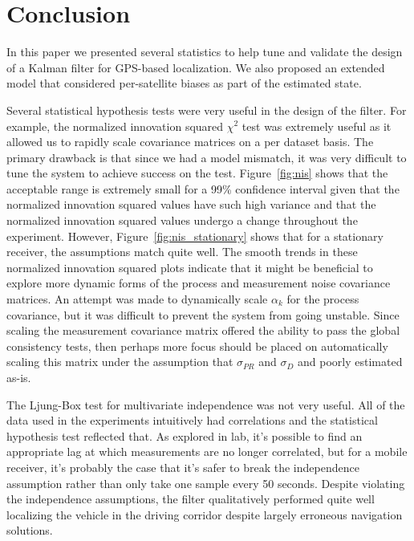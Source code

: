 \section{Conclusion}\label{sec:conclusion}
In this paper we presented several statistics to help tune and validate the design of a Kalman filter for GPS-based localization.  We also proposed an extended model that considered per-satellite biases as part of the estimated state.

Several statistical hypothesis tests were very useful in the design of the filter.  For example, the normalized innovation squared $\chi^2$ test was extremely useful as it allowed us to rapidly scale covariance matrices on a per dataset basis.  The primary drawback is that since we had a model mismatch, it was very difficult to tune the system to achieve success on the test.  Figure~\ref{fig:nis} shows that the acceptable range is extremely small for a 99\% confidence interval given that the normalized innovation squared values have such high variance and that the normalized innovation squared values undergo a change throughout the experiment.  However, Figure~\ref{fig:nis_stationary} shows that for a stationary receiver, the assumptions match quite well.  The smooth trends in these normalized innovation squared plots indicate that it might be beneficial to explore more dynamic forms of the process and measurement noise covariance matrices.  An attempt was made to dynamically scale $\alpha_k$ for the process covariance, but it was difficult to prevent the system from going unstable.  Since scaling the measurement covariance matrix offered the ability to pass the global consistency tests, then perhaps more focus should be placed on automatically scaling this matrix under the assumption that $\sigma_{PR}$ and $\sigma_D$ and poorly estimated as-is.

The Ljung-Box test for multivariate independence was not very useful.  All of the data used in the experiments intuitively had correlations and the statistical hypothesis test reflected that.  As explored in lab, it's possible to find an appropriate lag at which measurements are no longer correlated, but for a mobile receiver, it's probably the case that it's safer to break the independence assumption rather than only take one sample every 50 seconds.  Despite violating the independence assumptions, the filter qualitatively performed quite well localizing the vehicle in the driving corridor despite largely erroneous navigation solutions.


